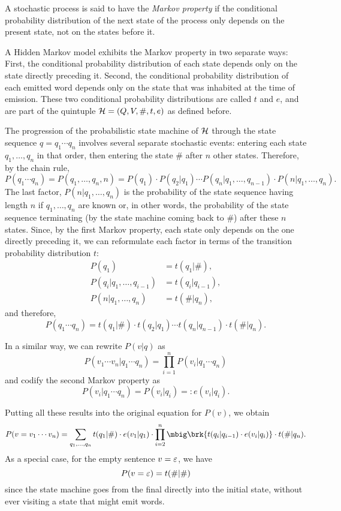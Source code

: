 \begin{definition}
 A stochastic process is said to have the \emph{Markov property} if the
 conditional probability distribution of the next state of the process only
 depends on the present state, not on the states before it.
\end{definition}

A Hidden Markov model exhibits the Markov property in two separate ways: First,
the conditional probability distribution of each state depends only on the
state directly preceding it. Second, the conditional probability distribution
of each emitted word depends only on the state that was inhabited at the time
of emission. These two conditional probability distributions are called $t$ and
$e$, and are part of the quintuple $\mathcal H=(Q,V,\#,t,e)$ as defined before.

The progression of the probabilistic state machine of $\mathcal H$ through the state
sequence $q=q_1\cdots q_n$ involves several separate stochastic events:
entering each state $q_1,\ldots,q_n$ in that order, then entering the state
$\#$ after $n$ other states. Therefore, by the chain rule,
\[
 P(q_1\cdots q_n) = P(q_1,\ldots,q_n,n) = P(q_1) \cdot P(q_2|q_1) \cdots P(q_n|q_1,\ldots,q_{n-1}) \cdot P(n|q_1,\ldots,q_n).
\]
The last factor, $P(n|q_1,\ldots,q_n)$ is the probability of the state sequence
having length $n$ if $q_1,\ldots,q_n$ are known or, in other words, the
probability of the state sequence terminating (by the state machine coming back
to $\#$) after these $n$ states. Since, by the first Markov property, each
state only depends on the one directly preceding it, we can reformulate each
factor in terms of the transition probability distribution $t$:
\begin{align*}
 P(q_1) &= t(q_1|\#), \\
 P(q_i|q_1,\ldots,q_{i-1}) &= t(q_i|q_{i-1}), \\
 P(n|q_1,\ldots,q_n) &= t(\#|q_n),
\end{align*}
and therefore,
\[
 P(q_1\cdots q_n) = t(q_1|\#) \cdot t(q_2|q_1) \cdots t(q_n|q_{n-1}) \cdot t(\#|q_n).
\]

In a similar way, we can rewrite $P(v|q)$ as
\[
 P(v_1\cdots v_n|q_1\cdots q_n) = \prod_{i=1}^n P(v_i|q_1\cdots q_n)
\]
and codify the second Markov property as
\[
 P(v_i|q_1\cdots q_n) = P(v_i|q_i) =: e(v_i|q_i).
\]

Putting all these results into the original equation for $P(v)$, we obtain
\[
 P(v=v_1\cdots v_n) = \sum_{q_1,\ldots,q_n} t(q_1|\#) \cdot e(v_1|q_1) \cdot \prod_{i=2}^n \mbig\brk{t(q_i|q_{i-1}) \cdot e(v_i|q_i)} \cdot t(\#|q_n).
\]
As a special case, for the empty sentence $v=\varepsilon$, we have
\[
 P(v=\varepsilon) = t(\#|\#)
\]
since the state machine goes from the final directly into the initial state,
without ever visiting a state that might emit words.

